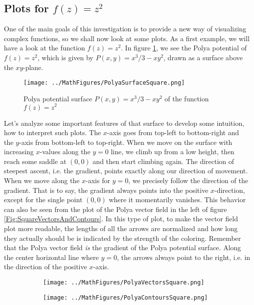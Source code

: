 \documentclass[12pt]{article}
\begin{document}
\subsection{Plots for $f(z) = z^2$}
One of the main goals of this investigation is to provide a new way of visualizing complex functions, so we shall now look at some plots. As a first example, we will have a look at the function $f(z) = z^2$. In figure \ref{Fig:SquareSurface}, we see the Polya potential of $f(z) = z^2$, which is given by $P(x,y) = x^3/3 - x y^2$, drawn as a surface above the $xy$-plane. 
\begin{figure}[h]
\caption{Polya potential surface $P(x,y) = x^3/3 - x y^2$ of the function $f(z) = z^2$}	
\label{Fig:SquareSurface}	
\centering
\texttt{[image: ../MathFigures/PolyaSurfaceSquare.png]}
\end{figure}
Let's analyze some important features of that surface to develop some intuition, how to interpret such plots. The $x$-axis goes from top-left to bottom-right and the $y$-axis from bottom-left to top-right. When we move on the surface with increasing $x$-values along the $y=0$ line, we climb up from a low height, then reach some saddle at $(0,0)$ and then start climbing again. The direction of steepest ascent, i.e. the gradient, points exactly along our direction of movement. When we move along the $x$-axis for $y=0$, we precisely follow the direction of the gradient. That is to say, the gradient always points into the positive $x$-direction, except for the single point $(0,0)$ where it momentarily vanishes. This behavior can also be seen from the plot of the Polya vector field in the left of figure \ref{Fig:SquareVectorsAndContours}. In this type of plot, to make the vector field plot more readable, the lengths of all the arrows are normalized and how long they actually should be is indicated by the strength of the coloring. Remember that the Polya vector field \emph{is} the gradient of the Polya potential surface. Along the center horizontal line where $y=0$, the arrows always point to the right, i.e. in the direction of the positive $x$-axis.
\begin{figure}[h]
\caption{Polya vector field and Polya potential contours of $f(z) = z^2$}	
\label{Fig:SquareVectorsAndContours}	
\centering
\begin{subfigure}[b]{0.49\textwidth}
\centering
\texttt{[image: ../MathFigures/PolyaVectorsSquare.png]}
\end{subfigure}
\begin{subfigure}[b]{0.49\textwidth}
\centering
\texttt{[image: ../MathFigures/PolyaContoursSquare.png]}
\end{subfigure}
\end{figure}
\end{document}
